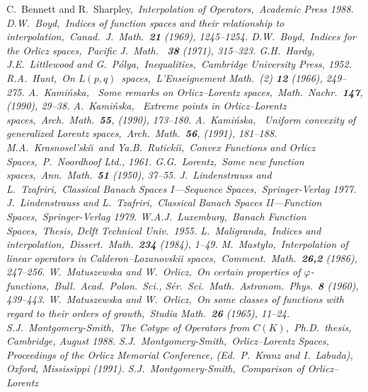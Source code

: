 \begin{thebibliography}{99}

\rm{} C.~Bennett and R.~Sharpley,\sl\ Interpolation of 
Operators,\rm\
Academic Press 1988.
\rm{} D.W.~Boyd,\rm\ Indices of function spaces and their 
relationship to
interpolation,\sl\ Canad.\ J.\ Math.\ {\bf 21} (1969), 1245--1254.
\rm\bibitem{c} D.W.~Boyd,\rm\ Indices for the Orlicz spaces,\sl\ 
Pacific J.\ Math.\ {\bf
38} (1971), 315--323.
\rm{} G.H.~Hardy, J.E.~Littlewood and G.~P\'olya,\sl\ 
Inequalities,\rm\
Cambridge University Press, 1952.
\rm\bibitem{e} R.A.~Hunt,\rm\ On $L(p,q)$\ spaces,\sl\ L'Enseignement 
Math.\ (2)
{\bf 12} (1966), 249--275.
\rm\bibitem{f} A.~Kami\'nska, \rm\ Some remarks on Orlicz--Lorentz 
spaces,\sl\ Math.\
Nachr.\ {\bf 147}, (1990), 29--38.
\rm{} A.~Kami\'nska, \rm\ Extreme points in Orlicz--Lorentz 
spaces,\sl\
Arch.\ Math.\ {\bf 55}, (1990), 173--180.
\rm\bibitem{h} A.~Kami\'nska, \rm\ 
Uniform convexity of generalized Lorentz spaces,\sl\
Arch.\ Math.\ {\bf 56}, (1991), 181--188.
\rm\bibitem{k} M.A.~Krasnosel'ski\u\i\ and Ya.B.~Ruticki\u\i,\sl\
Convex Functions and
Orlicz Spaces,\rm\ P.~Noordhoof Ltd., 1961.
\rm\bibitem{l} G.G.~Lorentz,\rm\ Some new function spaces,\sl\ Ann.\ 
Math.\ {\bf 51}
(1950), 37--55.
\rm\bibitem{m} J.~Lindenstrauss and L.~Tzafriri,\sl\ Classical Banach Spaces
I---Se\-qu\-ence Spa\-ces,\rm\ Springer-Verlag 1977.
\rm\bibitem{n} J.~Lindenstrauss and L.~Tzafriri,\sl\ Classical Banach Spaces
II---Fu\-nc\-t\-ion Spa\-ces,\rm\ Springer-Verlag 1979.
\rm\bibitem{o} W.A.J.~Luxemburg,\sl\ Banach Function Spaces,\rm\ Thesis, 
Delft Technical
Univ.\ 1955.
\rm\bibitem{p} L.~Maligranda,\rm\ Indices and interpolation,\sl\ Dissert.\ 
Math.\ {\bf 234}
(1984), 1--49.
\rm\bibitem{q} M.~Masty\l o,\rm\ Interpolation of linear operators in
Calderon--Lozanovskii spaces,\sl\ Comment.\ Math.\ {\bf 26,2} (1986),
247--256.
\rm\bibitem{r} W.~Matuszewska and W.~Orlicz,\rm\ On certain properties of
$\varphi$-functions,\sl\ Bull.\ Acad.\ Polon.\ Sci., S\'er.\ Sci.\ Math.\
Astronom.\ Phys.\ {\bf 8} (1960), 439--443.
\rm\bibitem{s} W.~Matuszewska and W.~Orlicz,\rm\ On some classes of 
functions with
regard to their orders of growth,\sl\ Studia Math.\ {\bf 26} (1965), 11--24.
\rm\bibitem{t} S.J.~Montgomery-Smith,\sl\ The Cotype of Operators from
$C(K)$,\rm\
Ph.D.\ thesis, Cambridge, August 1988.
\rm\bibitem{u} S.J.~Montgomery-Smith,\rm\ Orlicz--Lorentz Spaces, 
{\em Proceedings of the Orlicz
Memorial Conference}, (Ed.\ P.~Kranz and I.~Labuda), Oxford, Mississippi
(1991).
\rm\bibitem{v} S.J.~Montgomery-Smith,\rm\ Comparison of Orlicz--Lorentz 

\end{thebibliography}
